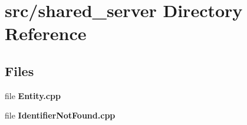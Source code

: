 \section{src/shared\+\_\+server Directory Reference}
\label{dir_30f9d8d923e768f9a22e7fd6ee21b3ad}
\subsection*{Files}
\begin{DoxyCompactItemize}
\item 
file {\bf Entity.\+cpp}
\item 
file {\bf Identifier\+Not\+Found.\+cpp}
\end{DoxyCompactItemize}
